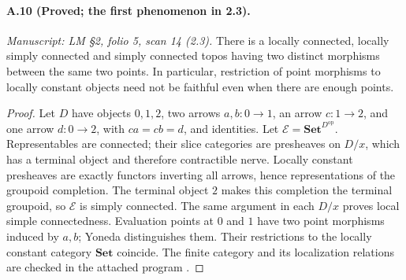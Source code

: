 \paragraph{A.10 (Proved; the first phenomenon in 2.3).}
\textit{Manuscript: LM \S2, folio 5, scan 14 (2.3).}
There is a locally connected, locally simply connected and simply connected topos having two distinct morphisms between the same two points. In particular, restriction of point morphisms to locally constant objects need not be faithful even when there are enough points.
\begin{proof}
Let $D$ have objects $0,1,2$, two arrows $a,b:0\to1$, an arrow $c:1\to2$, and one arrow $d:0\to2$, with $ca=cb=d$, and identities. Let $\mathcal E=\mathbf{Set}^{D^{\mathrm{op}}}$. Representables are connected; their slice categories are presheaves on $D/x$, which has a terminal object and therefore contractible nerve. Locally constant presheaves are exactly functors inverting all arrows, hence representations of the groupoid completion. The terminal object $2$ makes this completion the terminal groupoid, so $\mathcal E$ is simply connected. The same argument in each $D/x$ proves local simple connectedness. Evaluation points at $0$ and $1$ have two point morphisms induced by $a,b$; Yoneda distinguishes them. Their restrictions to the locally constant category $\mathbf{Set}$ coincide. The finite category and its localization relations are checked in the attached program . 
\end{proof}


